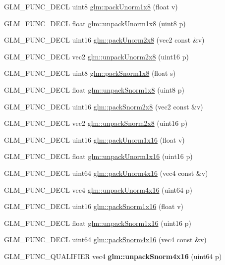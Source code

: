 \begin{DoxyCompactItemize}
\item 
G\+L\+M\+\_\+\+F\+U\+N\+C\+\_\+\+D\+E\+CL uint8 \hyperlink{group__gtc__packing_ga2f9963e5d762b10085b280d3662017ba}{glm\+::pack\+Unorm1x8} (float v)
\item 
G\+L\+M\+\_\+\+F\+U\+N\+C\+\_\+\+D\+E\+CL float \hyperlink{group__gtc__packing_ga32f3f2642df2ea87449d59fb614a8305}{glm\+::unpack\+Unorm1x8} (uint8 p)
\item 
G\+L\+M\+\_\+\+F\+U\+N\+C\+\_\+\+D\+E\+CL uint16 \hyperlink{group__gtc__packing_ga833288fc0d4a79f19d0db75a6843bfe6}{glm\+::pack\+Unorm2x8} (vec2 const \&v)
\item 
G\+L\+M\+\_\+\+F\+U\+N\+C\+\_\+\+D\+E\+CL vec2 \hyperlink{group__gtc__packing_ga96ce0c24339ee676e28a027fffd1edf6}{glm\+::unpack\+Unorm2x8} (uint16 p)
\item 
G\+L\+M\+\_\+\+F\+U\+N\+C\+\_\+\+D\+E\+CL uint8 \hyperlink{group__gtc__packing_ga26b6cd7a35c46c4b6a342f3b97b47423}{glm\+::pack\+Snorm1x8} (float s)
\item 
G\+L\+M\+\_\+\+F\+U\+N\+C\+\_\+\+D\+E\+CL float \hyperlink{group__gtc__packing_ga6f2bebf536fbf7c8b97d4b306bb3354e}{glm\+::unpack\+Snorm1x8} (uint8 p)
\item 
G\+L\+M\+\_\+\+F\+U\+N\+C\+\_\+\+D\+E\+CL uint16 \hyperlink{group__gtc__packing_ga05d08a82923166ec7cd5d0e6154c9953}{glm\+::pack\+Snorm2x8} (vec2 const \&v)
\item 
G\+L\+M\+\_\+\+F\+U\+N\+C\+\_\+\+D\+E\+CL vec2 \hyperlink{group__gtc__packing_ga27f30f0281b88e152b0895f5e2ead878}{glm\+::unpack\+Snorm2x8} (uint16 p)
\item 
G\+L\+M\+\_\+\+F\+U\+N\+C\+\_\+\+D\+E\+CL uint16 \hyperlink{group__gtc__packing_ga60c7d915f5653559ae02c2f79a8c5c1d}{glm\+::pack\+Unorm1x16} (float v)
\item 
G\+L\+M\+\_\+\+F\+U\+N\+C\+\_\+\+D\+E\+CL float \hyperlink{group__gtc__packing_ga7770e3ade4f4764cc1b2eb42ac4ec188}{glm\+::unpack\+Unorm1x16} (uint16 p)
\item 
G\+L\+M\+\_\+\+F\+U\+N\+C\+\_\+\+D\+E\+CL uint64 \hyperlink{group__gtc__packing_gac561f06c908b7302537a8ef29fcb409e}{glm\+::pack\+Unorm4x16} (vec4 const \&v)
\item 
G\+L\+M\+\_\+\+F\+U\+N\+C\+\_\+\+D\+E\+CL vec4 \hyperlink{group__gtc__packing_gafb2b502bc406031a5618ce930139a9e3}{glm\+::unpack\+Unorm4x16} (uint64 p)
\item 
G\+L\+M\+\_\+\+F\+U\+N\+C\+\_\+\+D\+E\+CL uint16 \hyperlink{group__gtc__packing_gac29411d6c0f6ed0fe9f0396dfe92e0e8}{glm\+::pack\+Snorm1x16} (float v)
\item 
G\+L\+M\+\_\+\+F\+U\+N\+C\+\_\+\+D\+E\+CL float \hyperlink{group__gtc__packing_ga246f451cebf590726324f7a283e3d65e}{glm\+::unpack\+Snorm1x16} (uint16 p)
\item 
G\+L\+M\+\_\+\+F\+U\+N\+C\+\_\+\+D\+E\+CL uint64 \hyperlink{group__gtc__packing_ga9b237d7c66b7a71964e6d1f4dc06539f}{glm\+::pack\+Snorm4x16} (vec4 const \&v)
\item 
G\+L\+M\+\_\+\+F\+U\+N\+C\+\_\+\+Q\+U\+A\+L\+I\+F\+I\+ER vec4 {\bfseries glm\+::unpack\+Snorm4x16} (uint64 p)\hypertarget{namespaceglm_a1bfaa3f217fd7a4b6b9d3117ecb3fcac}{}\label{namespaceglm_a1bfaa3f217fd7a4b6b9d3117ecb3fcac}


\end{DoxyCompactItemize}
